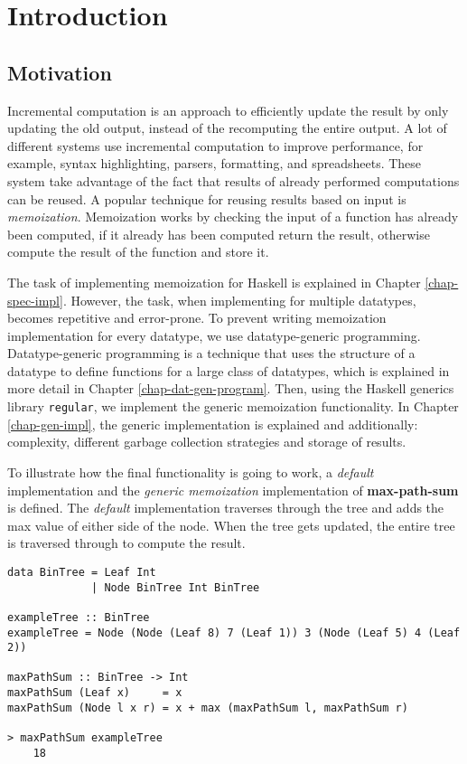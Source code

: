 \chapter{Introduction}

\section{Motivation}
Incremental computation is an approach to efficiently update the result by only updating the old output, instead of the recomputing the entire output. A lot of different systems use incremental computation to improve performance, for example, syntax highlighting, parsers, formatting, and spreadsheets. These system take advantage of the fact that results of already performed computations can be reused. A popular technique for reusing results based on input is \textit{memoization}. Memoization works by checking the input of a function has already been computed, if it already has been computed return the result, otherwise compute the result of the function and store it. 

The task of implementing memoization for Haskell is explained in Chapter \ref*{chap-spec-impl}. However, the task, when implementing for multiple datatypes, becomes repetitive and error-prone. To prevent writing memoization implementation for every datatype, we use datatype-generic programming. Datatype-generic programming is a technique that uses the structure of a datatype to define functions for a large class of datatypes, which is explained in more detail in Chapter \ref*{chap-dat-gen-program}. Then, using the Haskell generics library \texttt{regular}, we implement the generic memoization functionality. In Chapter \ref*{chap-gen-impl}, the generic implementation is explained and additionally: complexity, different garbage collection strategies and storage of results. 

To illustrate how the final functionality is going to work, a \textit{default} implementation  and the \textit{generic memoization} implementation of \textbf{max-path-sum} is defined. The \textit{default} implementation traverses through the tree and adds the max value of either side of the node. When the tree gets updated, the entire tree is traversed through to compute the result.

\begin{verbatim}
data BinTree = Leaf Int
             | Node BinTree Int BinTree 
             
exampleTree :: BinTree    
exampleTree = Node (Node (Leaf 8) 7 (Leaf 1)) 3 (Node (Leaf 5) 4 (Leaf 2))

maxPathSum :: BinTree -> Int
maxPathSum (Leaf x)     = x
maxPathSum (Node l x r) = x + max (maxPathSum l, maxPathSum r)

> maxPathSum exampleTree
    18
\end{verbatim}

